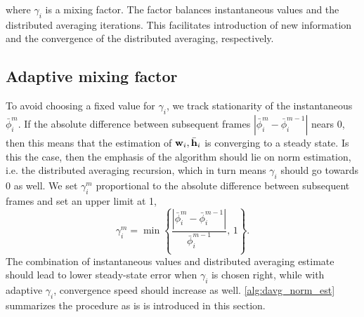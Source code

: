 \documentclass{article}
\begin{document}
where \(\gamma_i\) is a mixing factor.
The factor balances instantaneous values and the distributed averaging iterations.
This facilitates introduction of new information and the convergence of the distributed averaging, respectively.

\subsection[]{Adaptive mixing factor}
To avoid choosing a fixed value for \(\gamma_i\), we track stationarity of the instantaneous \(\bar{\phi}_i^{m}\).
If the absolute difference between subsequent frames \(| \bar{\phi}_i^{m} - \bar{\phi}_i^{m-1} |\) nears 0, then this means that the estimation of \(\bm{\mathrm{w}}_i, \bar{\bm{\mathrm{h}}}_i\) is converging to a steady state.
Is this the case, then the emphasis of the algorithm should lie on norm estimation, i.e. the distributed averaging recursion, which in turn means \(\gamma_i\) should go towards 0 as well.
We set \(\gamma_i^{m}\) proportional to the absolute difference between subsequent frames and set an upper limit at 1,
\begin{equation}
    \gamma_i^{m} = \min \left\lbrace \frac{| \bar{\phi}_i^{m} - \bar{\phi}_i^{m-1} |}{\bar{\phi}_i^{m-1}},\,1\right\rbrace.\label{eq:adaptivenormest:adaptivegamma}
\end{equation}
The combination of instantaneous values and distributed averaging estimate should lead to lower steady-state error when \(\gamma_i\) is chosen right, while with adaptive \(\gamma_i\), convergence speed should increase as well.
\autoref{alg:davg_norm_est} summarizes the procedure as is is introduced in this section.
\end{document}
